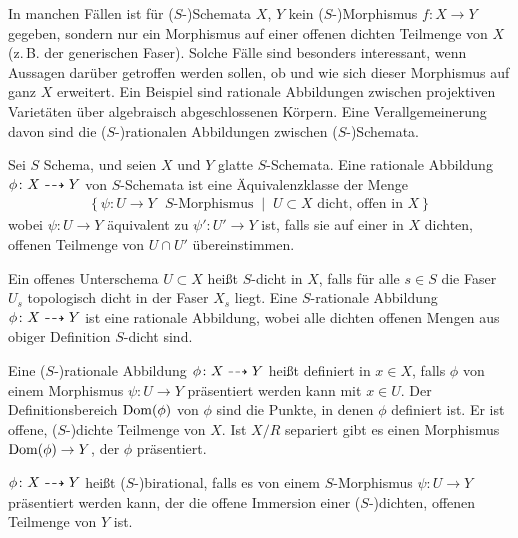 In manchen Fällen ist für ($S$-)Schemata $X$, $Y$ kein
($S$-)Morphismus $f\colon X\to Y$ gegeben, sondern nur ein Morphismus
auf einer offenen dichten Teilmenge von $X$ (z.\,B. der generischen
Faser). Solche Fälle sind besonders interessant, wenn Aussagen
darüber getroffen werden sollen, ob und wie sich dieser Morphismus auf
ganz $X$ erweitert. Ein Beispiel sind rationale Abbildungen zwischen
projektiven Varietäten über algebraisch abgeschlossenen Körpern.
Eine Verallgemeinerung davon sind die ($S$-)rationalen Abbildungen
zwischen ($S$-)Schemata.
\begin{Definition}\label{def:ratabb}
  Sei $S$ Schema, und seien $X$ und $Y$ glatte $S$-Schemata.
  Eine rationale Abbildung $\phi\colon X\dashrightarrow Y$ von
  $S$-Schemata ist eine Äquivalenzklasse der Menge
  \begin{gather*}
    \left\{
      \psi\colon U\to Y \text{ $S$-Morphismus}
      \;\middle|\;
      U\subset X \text{ dicht, offen in $X$}
    \right\}
  \end{gather*}
  wobei $\psi\colon U\to Y$ äquivalent zu $\psi'\colon U'\to Y$ ist,
  falls sie auf einer in $X$ dichten, offenen Teilmenge von $U\cap U'$
  übereinstimmen.
  
  Ein offenes Unterschema $U\subset X$ heißt $S$-dicht in $X$,
  falls für alle $s\in S$ die Faser $U_s$ %
  topologisch dicht in der Faser $X_s$ %
  liegt.
  Eine $S$-rationale Abbildung $\phi\colon X\dashrightarrow Y$ ist eine
  rationale Abbildung, wobei alle dichten offenen Mengen aus obiger
  Definition $S$-dicht sind.

  Eine ($S$-)rationale Abbildung $\phi\colon X\dashrightarrow Y$ heißt definiert
  in $x\in X$, falls $\phi$ von einem Morphismus $\psi\colon U\to Y$
  präsentiert werden kann mit $x\in U$.
  Der Definitionsbereich $\operatorname{Dom}(\phi)$ von $\phi$ sind die
  Punkte, in denen $\phi$ definiert ist. Er ist offene, ($S$-)dichte
  Teilmenge von $X$. Ist $X/R$ separiert gibt es einen Morphismus
  $\operatorname{Dom}(\phi)\to Y$, der $\phi$ präsentiert.
  
  $\phi\colon X\dashrightarrow Y$ heißt ($S$-)birational, falls es von einem
  $S$-Morphismus $\psi\colon U\to Y$ präsentiert werden kann, der
  die offene Immersion einer ($S$-)dichten, offenen Teilmenge von $Y$
  ist.
\end{Definition}

